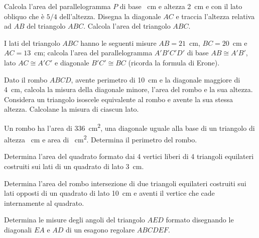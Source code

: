 \begin{multicols}{2}
\begin{esercizio}
\label{ese:7.49}
Calcola l'area del parallelogramma $P$ di base ~cm e altezza 
2~cm e con il lato obliquo che è $5/4$ dell'altezza. Disegna la 
diagonale $AC$ e traccia l'altezza relativa ad $AB$ del triangolo 
$ABC$. Calcola l'area del triangolo $ABC$.
\end{esercizio}

\begin{esercizio}
\label{ese:7.50}
I lati del triangolo $ABC$ hanno le seguenti misure $AB=21$~cm, 
$BC=20$~cm e $AC=13$~cm; calcola l'area del parallelogramma 
$A'B'C'D'$ di base $AB\cong A'B'$, lato $AC\cong A'C'$ e diagonale 
$B'C'\cong BC$ (ricorda la formula di Erone).
\end{esercizio}

\begin{esercizio}
\label{ese:7.51}
Dato il rombo $ABCD$, avente perimetro di 10~cm e la diagonale 
maggiore di 4~cm, calcola la misura della diagonale minore, l'area 
del rombo e la sua altezza. Considera un triangolo isoscele 
equivalente al rombo e avente la sua stessa altezza. Calcolane la 
misura di ciascun lato.
\end{esercizio}

\begin{esercizio}
\label{ese:7.52}
Un rombo ha l'area di 336~cm\textsuperscript{2}, una diagonale uguale 
alla base di un triangolo di altezza ~cm e area di 
~cm\textsuperscript{2}. Determina il perimetro del rombo.
\end{esercizio}

\begin{esercizio}
\label{ese:7.53}
Determina l'area del quadrato formato dai 4 vertici liberi di 4 
triangoli equilateri costruiti sui lati di un quadrato di lato 3~cm.
\end{esercizio}

\begin{esercizio}
\label{ese:7.54}
Determina l'area del rombo intersezione di due triangoli equilateri 
costruiti sui lati opposti di un quadrato di lato 10~cm e aventi il 
vertice che cade internamente al quadrato.
\end{esercizio}

\begin{esercizio}
\label{ese:7.55}
Determina le misure degli angoli del triangolo $AED$ formato 
disegnando le diagonali $EA$ e $AD$ di un esagono regolare $ABCDEF$.
\end{esercizio}


\end{multicols}
